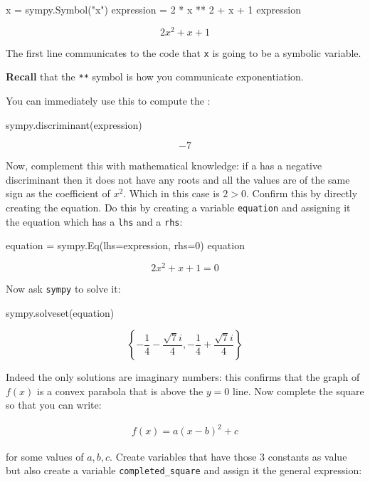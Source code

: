 \begin{pyin}
x = sympy.Symbol("x")
expression = 2 * x ** 2 + x + 1
expression
\end{pyin}

\[
2 x^{2} + x + 1
\]


The first line communicates to the code that \texttt{x} is going to be a symbolic variable.

\begin{note}
\textbf{Recall} that the \texttt{**} symbol is how you communicate exponentiation.
\end{note}

You can immediately use this to compute the :

\begin{pyin}
sympy.discriminant(expression)
\end{pyin}

\[-7\]

Now, complement this with mathematical knowledge: if a  has a
negative discriminant then it does not have any roots and all the values are of
the same sign as the coefficient of \(x ^ 2 \). Which in this case is \(2>0\).
Confirm this by directly creating the equation. Do this by creating a
variable \texttt{equation} and assigning it the equation which has a
\texttt{lhs} and a \texttt{rhs}:

\begin{pyin}
equation = sympy.Eq(lhs=expression, rhs=0)
equation
\end{pyin}

\[2 x^{2} + x + 1 = 0\]

Now ask \texttt{sympy} to solve it:

\begin{pyin}
sympy.solveset(equation)
\end{pyin}

\[\left\{- \frac{1}{4} - \frac{\sqrt{7} i}{4}, - \frac{1}{4} + \frac{\sqrt{7} i}{4}\right\}\]

Indeed the only solutions are imaginary numbers: this confirms that the graph of
\(f(x)\) is a convex parabola that is above the \(y=0\) line.
Now complete the square so that you can write:

\begin{equation*}
\begin{split}
    f(x) = a (x - b) ^ 2 + c
\end{split}
\end{equation*}

for some values of \(a, b, c\). Create variables that have those 3 constants as
value but also create a variable \texttt{completed\_square} and assign it the
general expression:

